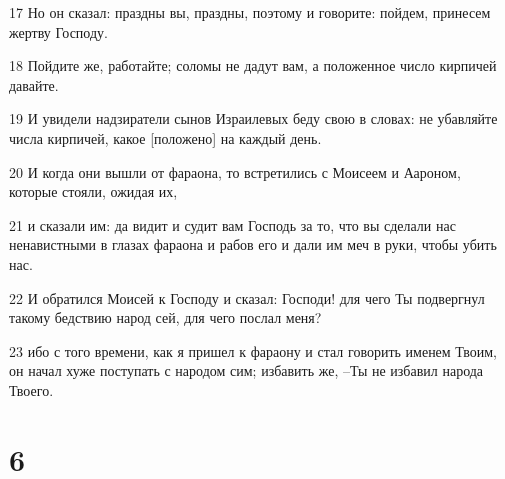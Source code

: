 \par 17 Но он сказал: праздны вы, праздны, поэтому и говорите: пойдем, принесем жертву Господу.
\par 18 Пойдите же, работайте; соломы не дадут вам, а положенное число кирпичей давайте.
\par 19 И увидели надзиратели сынов Израилевых беду свою в словах: не убавляйте числа кирпичей, какое [положено] на каждый день.
\par 20 И когда они вышли от фараона, то встретились с Моисеем и Аароном, которые стояли, ожидая их,
\par 21 и сказали им: да видит и судит вам Господь за то, что вы сделали нас ненавистными в глазах фараона и рабов его и дали им меч в руки, чтобы убить нас.
\par 22 И обратился Моисей к Господу и сказал: Господи! для чего Ты подвергнул такому бедствию народ сей, для чего послал меня?
\par 23 ибо с того времени, как я пришел к фараону и стал говорить именем Твоим, он начал хуже поступать с народом сим; избавить же, --Ты не избавил народа Твоего.

\chapter{6}

